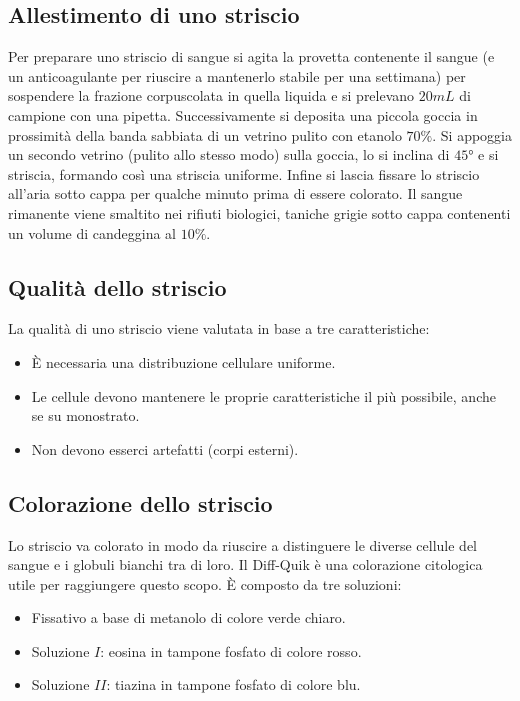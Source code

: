 	\subsection{Allestimento di uno striscio}
	Per preparare uno striscio di sangue si agita la provetta contenente il sangue (e un anticoagulante per riuscire a mantenerlo stabile per una settimana) per sospendere la frazione corpuscolata in quella liquida e si prelevano $20\si{mL}$ di campione con una pipetta.
	Successivamente si deposita una piccola goccia in prossimit\`a della banda sabbiata di un vetrino pulito con etanolo $70\%$.
	Si appoggia un secondo vetrino (pulito allo stesso modo) sulla goccia, lo si inclina di $45\si{\degree}$ e si striscia, formando cos\`i una striscia uniforme.
	Infine si lascia fissare lo striscio all'aria sotto cappa per qualche minuto prima di essere colorato.
	Il sangue rimanente viene smaltito nei rifiuti biologici, taniche grigie sotto cappa contenenti un volume di candeggina al $10\%$.

	\subsection{Qualit\`a dello striscio}
	La qualit\`a di uno striscio viene valutata in base a tre caratteristiche:
		\begin{multicols}{2}
	\begin{itemize}
		\item \`E necessaria una distribuzione cellulare uniforme.
		\item Le cellule devono mantenere le proprie caratteristiche il pi\`u possibile, anche se su monostrato.
		\item Non devono esserci artefatti (corpi esterni).
	\end{itemize}
\end{multicols}

	\subsection{Colorazione dello striscio}
	Lo striscio va colorato in modo da riuscire a distinguere le diverse cellule del sangue e i globuli bianchi tra di loro. 
	Il Diff-Quik \`e una colorazione citologica utile per raggiungere questo scopo.
	\`E composto da tre soluzioni:
		\begin{multicols}{2}
	\begin{itemize}
		\item Fissativo a base di metanolo di colore verde chiaro.
		\item Soluzione $I$: eosina in tampone fosfato di colore rosso.
		\item Soluzione $II$: tiazina in tampone fosfato di colore blu.
	\end{itemize}
\end{multicols}

